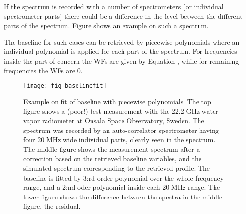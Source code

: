  If the spectrum is recorded with a number of spectrometers (or
 individual spectrometer parts) there could be a difference in the
 level between the different parts of the spectrum. Figure
  shows an example on such a spectrum.
 
 The baseline for such cases can be retrieved by piecewise polynomials
 where an individual polynomial is applied for each part of the
 spectrum. For frequencies inside the part of concern the WFs are
 given by Equation , while for remaining
 frequencies the WFs are 0.  

 \begin{figure}[t]
  \begin{center}
   \texttt{[image: fig\_baselinefit]}
   \caption{Example on fit of baseline with piecewise polynomials.
     The top figure shows a (poor!) test measurement with the 22.2 GHz
     water vapor radiometer at Onsala Space Observatory, Sweden.  The
     spectrum was recorded by an auto-correlator spectrometer having
     four 20 MHz wide individual parts, clearly seen in the spectrum.
     The middle figure shows the measurement spectrum after a
     correction based on the retrieved baseline variables, and the
     simulated spectrum corresponding to the retrieved profile. The
     baseline is fitted by 3:rd order polynomial over the whole
     frequency range, and a 2:nd oder polynomial inside each 20 MHz
     range. The lower figure shows the difference between the spectra
     in the middle figure, the residual.}
  \end{center}
 \end{figure}



